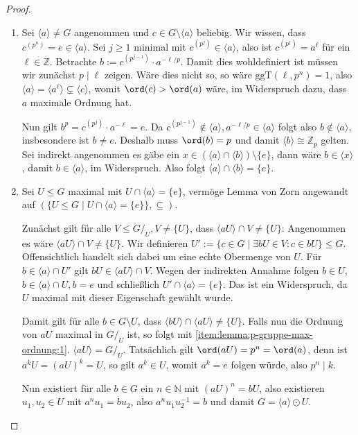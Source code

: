 \begin{proof}{\ }
    \begin{enumerate}
        \item Sei $\langle a \rangle \neq G$ angenommen und $c \in G \setminus \langle a \rangle$ beliebig. Wir wissen, dass $c^{(p^n)} = e \in \langle a \rangle$. Sei $j \geq 1$ minimal mit $c^{(p^j)} \in \langle a \rangle$, also ist
            $c^{(p^j)} = a^\ell$ für ein $\ell\in\mathbb{Z}$. Betrachte $b := c^{(p^{j-1})} \cdot a^{-\ell / p}$. Damit dies wohldefiniert ist müssen wir zunächst $p \mid \ell$ zeigen. Wäre dies nicht so, so wäre $\mathrm{ggT}(\ell, p^n) = 1$, also $\langle a \rangle = \langle a^\ell \rangle \subsetneq \langle c \rangle$, womit $\ord(c) > \ord(a)$ wäre, im Widerspruch dazu, dass $a$ maximale Ordnung hat.
            
            Nun gilt $b^p = c^{(p^j)} \cdot a^{- \ell} = e$. Da $c^{(p^{j-1})} \not\in \langle a \rangle, a^{-\ell / p} \in \langle a \rangle$ folgt also $b \not\in \langle a \rangle$, insbesondere ist $b \neq e$. Deshalb muss $\ord(b) = p$ und damit $\langle b \rangle \cong \mathbb{Z}_p$ gelten. Sei indirekt angenommen es gäbe ein $x \in (\langle a \rangle \cap \langle b \rangle) \setminus \{e\}$, dann wäre $b \in \langle x \rangle$, damit $b \in \langle a \rangle$, im Widerspruch. Also folgt $\langle a \rangle \cap \langle b \rangle = \{e\}$.

        \item Sei $U \leq G$ maximal mit $U \cap \langle a \rangle = \{e\}$, vermöge Lemma von Zorn angewandt auf $(\{ U \leq G \mid U \cap \langle a \rangle = \{e\} \}, \subseteq)$.

        Zunächst gilt für alle $V \leq G/_U, V \neq \{ U \}$, dass $\langle aU \rangle \cap V \neq \{ U \}$: Angenommen es wäre $\langle aU\rangle\cap V\neq \{U\}$. Wir definieren $U':=\{c\in G\mid \exists bU\in V:c\in bU\}\le G$. Offensichtlich handelt sich dabei um eine echte Obermenge von $U$. Für $b\in\langle a\rangle\cap U'$ gilt $bU\in\langle aU\rangle\cap V$. Wegen der indirekten Annahme folgen $b\in U$, $b\in \langle a\rangle\cap U, b=e$ und schließlich $U'\cap\langle a\rangle=\{e\}$. Das ist ein Widerspruch, da $U$ maximal mit dieser Eigenschaft gewählt wurde.
    
        Damit gilt für alle $b \in G \setminus U$, dass $\langle bU \rangle \cap \langle aU \rangle \neq \{ U \}$. Falls nun die Ordnung von $aU$ maximal in $G/_U$ ist, so folgt mit \ref*{item:lemma:p-gruppe-max-ordnung:1}. $\langle a U \rangle = G/_U$. Tatsächlich gilt $\ord(aU) = p^n = \ord(a)$, denn ist $a^k U = (aU)^k = U$, so gilt $a^k \in U$, womit $a^k = e$ folgen würde, also $p^n \mid k$.

        Nun existiert für alle $b \in G$ ein $n\in\mathbb{N}$ mit $(aU)^n = bU$, also existieren $u_1, u_2 \in U$ mit $a^n u_1 = b u_2$, also $a^n u_1 u_2^{-1} = b$ und damit $G = \langle a \rangle \odot U$.
    \end{enumerate}
\end{proof}

